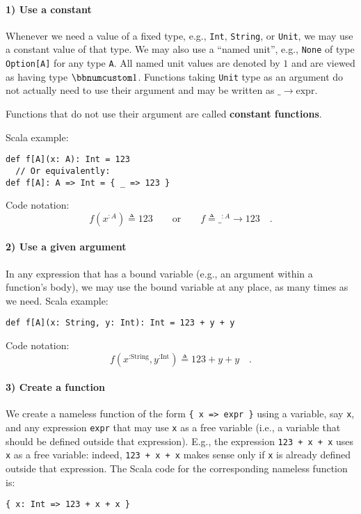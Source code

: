 \paragraph{1) Use a constant}

Whenever we need a value of a fixed type, e.g., \lstinline!Int!,
\lstinline!String!, or \lstinline!Unit!, we may use a constant value
of that type. We may also use a \textsf{``}named unit\textsf{''},
e.g., \lstinline!None! of type \lstinline!Option[A]! for any type
\lstinline!A!. All named unit values are denoted by $1$ and are
viewed as having type $\bbnum 1$. Functions taking \lstinline!Unit!
type as an argument do not actually need to use their argument and
may be written as $\_\rightarrow\text{expr}$.

Functions that do not use their argument are called \textbf{constant
functions}.

Scala example:
\begin{lstlisting}
def f[A](x: A): Int = 123
  // Or equivalently:
def f[A]: A => Int = { _ => 123 }
\end{lstlisting}
Code notation:
\[
f(x^{:A})\triangleq123\quad\quad\text{or}\quad\quad f\triangleq\_^{:A}\rightarrow123\quad.
\]


\paragraph{2) Use a given argument}

In any expression that has a bound variable
(e.g., an argument within a function\textsf{'}s body), we may use the bound
variable at any place, as many times as we need. Scala example:
\begin{lstlisting}
def f[A](x: String, y: Int): Int = 123 + y + y
\end{lstlisting}
Code notation:
\[
f(x^{:\text{String}},y^{:\text{Int}})\triangleq123+y+y\quad.
\]


\paragraph{3) Create a function}

We create a nameless function of the form \lstinline!{ x => expr }!
using a variable, say \lstinline!x!, and any expression \lstinline!expr!
that may use \lstinline!x! as a free variable
(i.e., a variable that should be defined outside that expression).
E.g., the expression \lstinline!123 + x + x! uses \lstinline!x!
as a free variable: indeed, \lstinline!123 + x + x! makes sense only
if \lstinline!x! is already defined outside that expression. The
Scala code for the corresponding nameless function is:
\begin{lstlisting}
{ x: Int => 123 + x + x }
\end{lstlisting}


